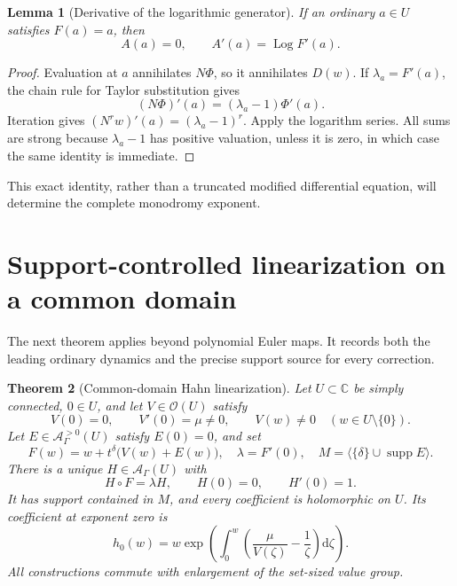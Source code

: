 \documentclass[11pt,a4paper]{article}
\numberwithin{equation}{section}
\newtheorem{theorem}{Theorem}[section]
\newtheorem{lemma}[theorem]{Lemma}
\theoremstyle{definition}
\theoremstyle{remark}
\newcommand{\C}{\mathbb C}
\newcommand{\A}{\mathscr A_\Gamma}
\newcommand{\dd}{\mathrm d}
\newcommand{\supp}{\operatorname{supp}}
\newcommand{\Hol}{\mathcal O}
\newcommand{\Log}{\operatorname{Log}}
\newcommand{\Neu}[1]{\langle #1\rangle}
\begin{document}
\begin{lemma}[Derivative of the logarithmic generator]
\label{lem:fixedderivative}
If an ordinary $a\in U$ satisfies $F(a)=a$, then
\begin{equation}\label{eq:fixedderivative}
 A(a)=0,\qquad A'(a)=\Log F'(a).
\end{equation}
\end{lemma}

\begin{proof}
Evaluation at $a$ annihilates $N\Phi$, so it annihilates $D(w)$.
If $\lambda_a=F'(a)$, the chain rule for Taylor substitution gives
\[
 (N\Phi)'(a)=(\lambda_a-1)\Phi'(a).
\]
Iteration gives $(N^r w)'(a)=(\lambda_a-1)^r$.  Apply the logarithm series.
All sums are strong because $\lambda_a-1$ has positive valuation, unless it
is zero, in which case the same identity is immediate.
\end{proof}

This exact identity, rather than a truncated modified differential
 equation, will determine the complete monodromy exponent.

\section{Support-controlled linearization on a common domain}
\label{sec:linearization}

The next theorem applies beyond polynomial Euler maps.  It records both the
leading ordinary dynamics and the precise support source for every
correction.

\begin{theorem}[Common-domain Hahn linearization]
\label{thm:common}
Let $U\subset\C$ be simply connected, $0\in U$, and let
$V\in\Hol(U)$ satisfy
\[
 V(0)=0,\qquad V'(0)=\mu\ne0,\qquad V(w)\ne0\quad(w\in U\setminus\{0\}).
\]
Let $E\in\A^{>0}(U)$ satisfy $E(0)=0$, and set
\begin{equation}\label{eq:generalF}
 F(w)=w+t^\delta\bigl(V(w)+E(w)\bigr),\quad
 \lambda=F'(0),\quad
 M=\Neu{\{\delta\}\cup\supp E}.
\end{equation}
There is a unique $H\in\A(U)$ with
\begin{equation}\label{eq:generalH}
 H\circ F=\lambda H,\qquad H(0)=0,
 \qquad H'(0)=1.
\end{equation}
It has support contained in $M$, and every coefficient is holomorphic on
$U$.  Its coefficient at exponent zero is
\begin{equation}\label{eq:leadingH}
 h_0(w)=w\exp\!\left(\int_0^w
        \left(\frac{\mu}{V(\zeta)}-\frac1\zeta\right)\dd\zeta\right).
\end{equation}
All constructions commute with enlargement of the set-sized value group.
\end{theorem}
\end{document}
